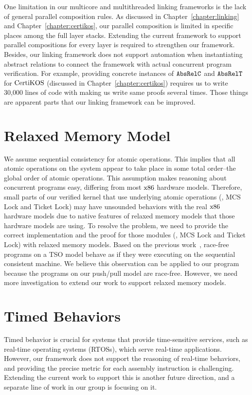 One limitation in our multicore and multithreaded linking frameworks is the lack of general parallel composition rules. 
As discussed in Chapter~\ref{chapter:linking} and Chapter~\ref{chapter:certikos}, 
our parallel composition is limited in specific places among the full layer stacks. Extending the current framework to support parallel compositions for every layer is required to strengthen our framework.
Besides, our linking framework does not support automation when instantiating abstract relations to connect the framework with actual concurrent program verification.
For example, providing concrete instances of ${{\mathrm{\texttt{AbsRelC}}}}$ and ${{\mathrm{\texttt{AbsRelT}}}}$ for $\mathrm{CertiKOS}$ (discussed in Chapter~\ref{chapter:certikos}) requires us to write 30,000 lines of code with making us write same proofs several times. 
Those things are apparent parts that our linking framework can be improved. 


\section{Relaxed Memory Model}

We assume sequential consistency for atomic operations. 
This implies that all atomic operations on the system appear to take place in some total order--the global order of atomic operations.
This assumption makes reasoning about concurrent programs easy, differing from most $\mathrm{x86}$
 hardware models. 
Therefore, small parts of our verified kernel that use underlying atomic operations (\ie, MCS Lock and Ticket Lock) may have unsounded behaviors with the real $\mathrm{x86}$ hardware models due to native features of relaxed memory models that those hardware models are using. 
To resolve the problem, we need to provide the correct implementation and the proof for those modules (\ie, MCS Lock and Ticket Lock) with relaxed memory models. 
Based on the previous work~\cite{sevcik13}, 
race-free programs on a TSO model behave as if they were executing on the sequential consistent machine. 
We believe this observation can be applied to our program because the programs on our push/pull model are race-free. 
However, we need more investigation to extend our work to support relaxed memory models.


\section{Timed Behaviors}

Timed behavior is crucial for systems that provide time-sensitive services, such as real-time operating systems (RTOSs), 
which serve real-time applications. However, our framework does not support the reasoning of real-time behaviors, 
and providing the precise metric for each assembly instruction is challenging. Extending the current work to support 
this is another future direction, and a separate line of work in our group is focusing on it.


